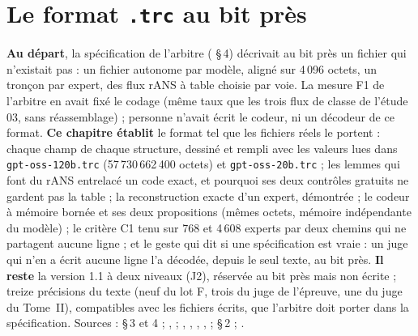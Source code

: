 


\chapter{Le format \texttt{.trc} au bit près}\label{t2fmt:ch}

\begin{origine}
\textbf{Au départ}, la spécification de l'arbitre ( §\,4) décrivait au bit près un fichier qui n'existait pas : un fichier autonome par modèle, aligné sur 4\,096 octets, un tronçon par expert, des flux rANS à table choisie par voie. La mesure F1 de l'arbitre en avait fixé le codage (même taux que les trois flux de classe de l'étude 03, sans réassemblage) ; personne n'avait écrit le codeur, ni un décodeur de ce format.
\textbf{Ce chapitre établit} le format tel que les fichiers réels le portent : chaque champ de chaque structure, dessiné et rempli avec les valeurs lues dans \texttt{gpt-oss-120b.trc} (57\,730\,662\,400 octets) et \texttt{gpt-oss-20b.trc} ; les lemmes qui font du rANS entrelacé un code exact, et pourquoi ses deux contrôles gratuits ne gardent pas la table ; la reconstruction exacte d'un expert, démontrée ; le codeur à mémoire bornée et ses deux propositions (mêmes octets, mémoire indépendante du modèle) ; le critère C1 tenu sur 768 et 4\,608 experts par deux chemins qui ne partagent aucune ligne ; et le geste qui dit si une spécification est vraie : un juge qui n'en a écrit aucune ligne l'a décodée, depuis le seul texte, au bit près.
\textbf{Il reste} la version 1.1 à deux niveaux (J2), réservée au bit près mais non écrite ; treize précisions du texte (neuf du lot F, trois du juge de l'épreuve, une du juge du Tome~II), compatibles avec les fichiers écrits, que l'arbitre doit porter dans la spécification.
Sources :  §\,3 et 4 ; ,  ; , , , ,  ;  §\,2 ; .
\end{origine}

